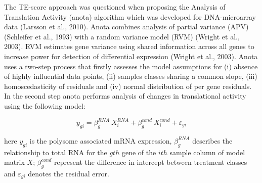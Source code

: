 \documentclass[
  12pt,
  openany]{book}
\begin{document}
The TE-score approach was questioned when proposing the Analysis of Translation Activity (anota) algorithm which was developed for DNA-microarray data (Larsson et al., 2010). Anota combines analysis of partial variance (APV) (Schleifer et al., 1993) with a random variance model (RVM) (Wright et al., 2003). RVM estimates gene variance using shared information across all genes to increase power for detection of differential expression (Wright et al., 2003). Anota uses a two-step process that firstly assesses the model assumptions for (i) absence of highly influential data points, (ii) samples classes sharing a common slope, (iii) homoscedasticity of residuals and (iv) normal distribution of per gene residuals. In the second step anota performs analysis of changes in translational activity using the following model:

\[y_{gi} = \beta_g^{RNA}\ X_i^{RNA}+ \beta_g^{cond}\ X_i^{cond} + \varepsilon_{gi}\]

here \(y_{gi}\) is the polysome associated mRNA expression, \(\beta_g^{RNA}\) describes the relationship to total RNA for the \(gth\) gene of the \(ith\) sample column of model matrix \(X\); \(\beta_g^{cond}\) represent the difference in intercept between treatment classes and \(\varepsilon_{gi}\) denotes the residual error.
\clearpage
\end{document}
